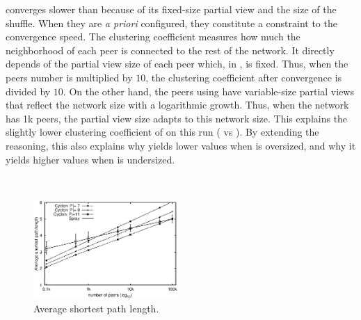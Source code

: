 \begin{asparadesc}
  converges slower than \SPRAY because of its fixed-size partial view and the
  size of the shuffle. When they are \emph{a priori} configured, they constitute
  a constraint to the convergence speed.  The clustering coefficient measures
  how much the neighborhood of each peer is connected to the rest of the
  network. It directly depends of the partial view size of each peer which, in
  \CYCLON, is fixed. Thus, when the peers number is multiplied by $10$, the
  clustering coefficient after convergence is divided by $10$. On the other
  hand, the peers using \SPRAY have variable-size partial views that reflect the
  network size with a logarithmic growth. Thus, when the network has 1k peers,
  the partial view size adapts to this network size. This explains the slightly
  lower clustering coefficient of \SPRAY on this run ( vs ). By extending the reasoning, this also explains why \SPRAY yields lower
  values when \CYCLON is oversized, and why it yields higher values when \CYCLON
  is undersized.
\end{asparadesc}

\ \\

\begin{figure}
  \centering
  \includegraphics[width=0.49\textwidth]{img/avgpath.eps}
  \caption{\label{fig:avgpath}Average shortest path length.}
\end{figure}

